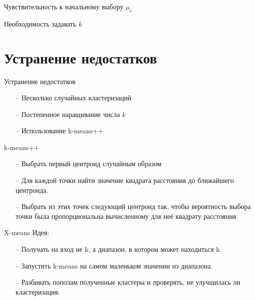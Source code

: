 \documentclass[10pt]{beamer}
\begin{document}
\begin{frame}{Чувствительность к начальному выбору $\mu_c$}
\end{frame}

\begin{frame}{Необходимость задавать $k$}
\end{frame}

\section{Устранение недостатков}

\begin{frame}{Устранение недостатков}
	\begin{itemize}
		\item[--] Несколько случайных кластеризаций
		\item[--] Постепенное наращивание числа $k$
		\item[--] Использование k-means++
	\end{itemize}
\end{frame}

\begin{frame}{k-means++}
	\begin{itemize}
		\item[--] Выбрать первый центроид случайным образом
		\item[--] Для каждой точки найти значение квадрата расстояния до ближайшего центроида.
		\item[--] Выбрать из этих точек следующий центроид так, чтобы вероятность выбора точки была пропорциональна вычисленному для неё квадрату расстояния
	\end{itemize}
\end{frame}

\begin{frame}{X-means}
	\alert{Идея}:\\
	\begin{itemize}
		\item[--] Получать на вход не k, а диапазон, в котором может находиться k.
		\item[--] Запустить k-means на самом маленьком значении из диапазона.
		\item[--] Разбивать пополам полученные кластеры и проверять, не улучшилась ли кластеризация.
	\end{itemize}
\end{frame}
\end{document}

